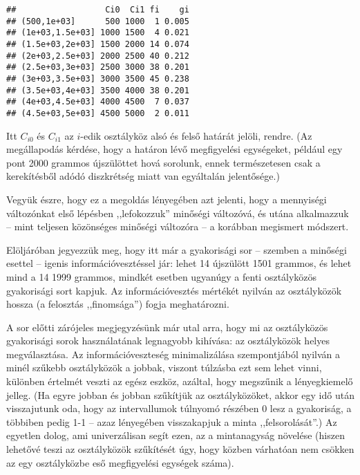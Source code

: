 \documentclass[
]{book}
\newenvironment{Shaded}{\begin{snugshade}}{\end{snugshade}}
\newcommand{\DataTypeTok}[1]{\textcolor[rgb]{0.13,0.29,0.53}{#1}}
\newcommand{\DecValTok}[1]{\textcolor[rgb]{0.00,0.00,0.81}{#1}}
\newcommand{\KeywordTok}[1]{\textcolor[rgb]{0.13,0.29,0.53}{\textbf{#1}}}
\newcommand{\NormalTok}[1]{#1}
\newcommand{\OperatorTok}[1]{\textcolor[rgb]{0.81,0.36,0.00}{\textbf{#1}}}
\newcommand{\StringTok}[1]{\textcolor[rgb]{0.31,0.60,0.02}{#1}}
\begin{document}
\begin{Shaded}
\end{Shaded}

\begin{verbatim}
##                  Ci0  Ci1 fi    gi
## (500,1e+03]      500 1000  1 0.005
## (1e+03,1.5e+03] 1000 1500  4 0.021
## (1.5e+03,2e+03] 1500 2000 14 0.074
## (2e+03,2.5e+03] 2000 2500 40 0.212
## (2.5e+03,3e+03] 2500 3000 38 0.201
## (3e+03,3.5e+03] 3000 3500 45 0.238
## (3.5e+03,4e+03] 3500 4000 38 0.201
## (4e+03,4.5e+03] 4000 4500  7 0.037
## (4.5e+03,5e+03] 4500 5000  2 0.011
\end{verbatim}

Itt \(C_{i0}\) és \(C_{i1}\) az \(i\)-edik osztályköz alsó és felső határát jelöli, rendre. (Az megállapodás kérdése, hogy a határon lévő megfigyelési egységeket, például egy pont 2000 grammos újszülöttet hová sorolunk, ennek természetesen csak a kerekítésből adódó diszkrétség miatt van egyáltalán jelentősége.)

Vegyük észre, hogy ez a megoldás lényegében azt jelenti, hogy a mennyiségi változónkat első lépésben ,,lefokozzuk'' minőségi változóvá, és utána alkalmazzuk -- mint teljesen közönséges minőségi változóra -- a korábban megismert módszert.

Elöljáróban jegyezzük meg, hogy itt már a gyakorisági sor -- szemben a minőségi esettel -- igenis információvesztéssel jár: lehet 14 újszülött 1501 grammos, és lehet mind a 14 1999 grammos, mindkét esetben ugyanúgy a fenti osztályközös gyakorisági sort kapjuk. Az információvesztés mértékét nyilván az osztályközök hossza (a felosztás ,,finomsága'') fogja meghatározni.

A sor előtti zárójeles megjegyzésünk már utal arra, hogy mi az osztályközös gyakorisági sorok használatának legnagyobb kihívása: az osztályközök helyes megválasztása. Az információveszteség minimalizálása szempontjából nyilván a minél szűkebb osztályközök a jobbak, viszont túlzásba ezt sem lehet vinni, különben értelmét veszti az egész eszköz, azáltal, hogy megszűnik a lényegkiemelő jelleg. (Ha egyre jobban és jobban szűkítjük az osztályközöket, akkor egy idő után visszajutunk oda, hogy az intervallumok túlnyomó részében 0 lesz a gyakoriság, a többiben pedig 1-1 -- azaz lényegében visszakapjuk a minta ,,felsorolását''.) Az egyetlen dolog, ami univerzálisan segít ezen, az a mintanagyság növelése (hiszen lehetővé teszi az osztályközök szűkítését úgy, hogy közben várhatóan nem csökken az egy osztályközbe eső megfigyelési egységek száma).
\end{document}
